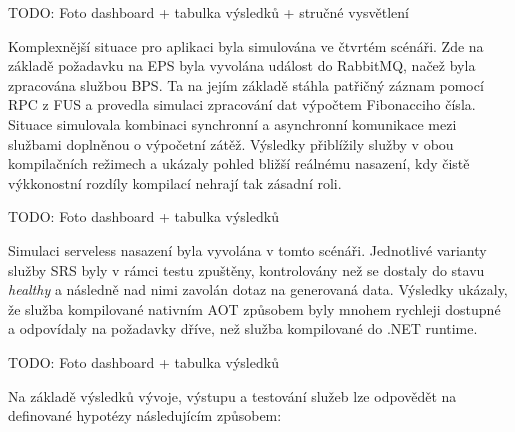 TODO: Foto dashboard + tabulka výsledků + stručné vysvětlení


Komplexnější situace pro aplikaci byla simulována ve čtvrtém scénáři. Zde na základě požadavku na EPS byla vyvolána událost do RabbitMQ, načež byla zpracována službou BPS. Ta na jejím základě stáhla patřičný záznam pomocí RPC z FUS a provedla simulaci zpracování dat výpočtem Fibonacciho čísla. Situace simulovala kombinaci synchronní a asynchronní komunikace mezi službami doplněnou o výpočetní zátěž. Výsledky přiblížily služby v obou kompilačních režimech a ukázaly pohled bližší reálnému nasazení, kdy čistě výkkonostní rozdíly kompilací nehrají tak zásadní roli. 

TODO: Foto dashboard + tabulka výsledků


Simulaci serveless nasazení byla vyvolána v tomto scénáři. Jednotlivé varianty služby SRS byly v rámci testu zpuštěny, kontrolovány než se dostaly do stavu \emph{healthy} a následně nad nimi zavolán dotaz na generovaná data. Výsledky ukázaly, že služba kompilované nativním AOT způsobem byly mnohem rychleji dostupné a odpovídaly na požadavky dříve, než služba kompilované do .NET runtime.

TODO: Foto dashboard + tabulka výsledků


Na základě výsledků vývoje, výstupu a testování služeb lze odpovědět na definované hypotézy následujícím způsobem:

